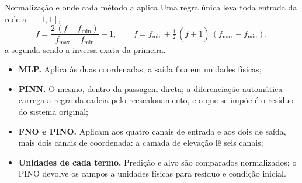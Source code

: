 \begin{frame}{Normalização e onde cada método a aplica}
  Uma regra única leva toda entrada da rede a $[-1,1]$,
  \begin{equation*}
    \tilde f = \frac{2\,(f - f_{\min})}{f_{\max} - f_{\min}} - 1,
    \qquad
    f = f_{\min} + \tfrac{1}{2}\,(\tilde f + 1)\,(f_{\max} - f_{\min}),
  \end{equation*}
  a segunda sendo a inversa exata da primeira.
  \begin{itemize}
    \item \textbf{MLP.} Aplica às duas coordenadas; a saída fica em unidades físicas;
    \item \textbf{PINN.} O mesmo, dentro da passagem direta; a diferenciação
          automática carrega a regra da cadeia pelo reescalonamento, e o que se impõe
          é o resíduo do sistema original;
    \item \textbf{FNO e PINO.} Aplicam aos quatro canais de entrada e aos dois de
          saída, mais dois canais de coordenada: a camada de elevação lê seis canais;
    \item \textbf{Unidades de cada termo.} Predição e alvo são comparados
          normalizados; o PINO devolve os campos a unidades físicas para resíduo e
          condição inicial.
  \end{itemize}
\end{frame}

